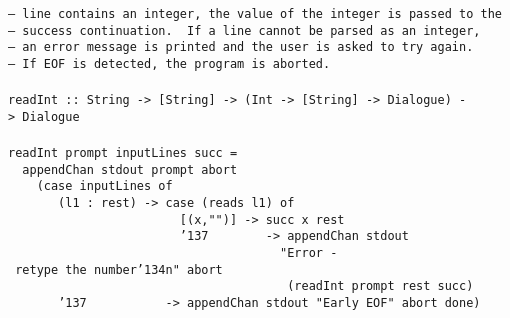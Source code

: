 \mbox{\tt --\ line\ contains\ an\ integer,\ the\ value\ of\ the\ integer\ is\ passed\ to\ the}\\
\mbox{\tt --\ success\ continuation.\ \ If\ a\ line\ cannot\ be\ parsed\ as\ an\ integer,}\\
\mbox{\tt --\ an\ error\ message\ is\ printed\ and\ the\ user\ is\ asked\ to\ try\ again.}\\
\mbox{\tt --\ If\ EOF\ is\ detected,\ the\ program\ is\ aborted.}\\
\mbox{\tt }\\[-8pt]
\mbox{\tt readInt\ ::\ String\ ->\ [String]\ ->\ (Int\ ->\ [String]\ ->\ Dialogue)\ ->\ Dialogue}\\
\mbox{\tt }\\[-8pt]
\mbox{\tt readInt\ prompt\ inputLines\ succ\ =}\\
\mbox{\tt \ \ appendChan\ stdout\ prompt\ abort}\\
\mbox{\tt \ \ \ \ (case\ inputLines\ of}\\
\mbox{\tt \ \ \ \ \ \ \ (l1\ :\ rest)\ ->\ case\ (reads\ l1)\ of}\\
\mbox{\tt \ \ \ \ \ \ \ \ \ \ \ \ \ \ \ \ \ \ \ \ \ \ \ \ [(x,"")]\ ->\ succ\ x\ rest}\\
\mbox{\tt \ \ \ \ \ \ \ \ \ \ \ \ \ \ \ \ \ \ \ \ \ \ \ \ {\char'137}\ \ \ \ \ \ \ \ ->\ appendChan\ stdout}\\
\mbox{\tt \ \ \ \ \ \ \ \ \ \ \ \ \ \ \ \ \ \ \ \ \ \ \ \ \ \ \ \ \ \ \ \ \ \ \ \ \ \ "Error\ -\ retype\ the\ number{\char'134}n"\ abort}\\
\mbox{\tt \ \ \ \ \ \ \ \ \ \ \ \ \ \ \ \ \ \ \ \ \ \ \ \ \ \ \ \ \ \ \ \ \ \ \ \ \ \ \ (readInt\ prompt\ rest\ succ)}\\
\mbox{\tt \ \ \ \ \ \ \ {\char'137}\ \ \ \ \ \ \ \ \ \ \ ->\ appendChan\ stdout\ "Early\ EOF"\ abort\ done)}
\eprog


